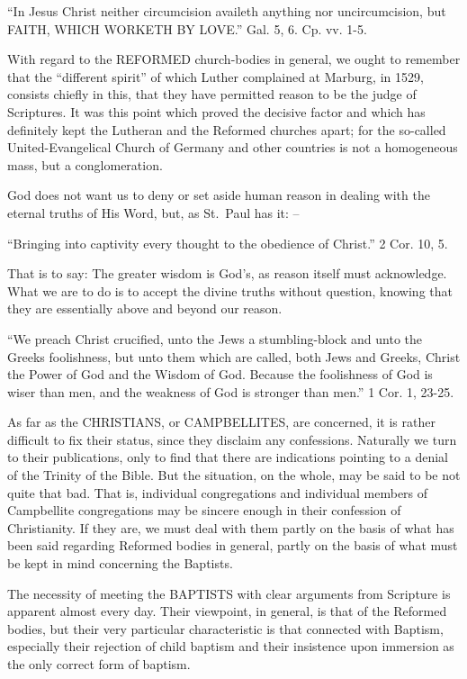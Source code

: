 \documentclass[
]{book}
\begin{document}
``In Jesus Christ neither circumcision availeth anything nor uncircumcision, but FAITH, WHICH WORKETH BY LOVE.'' Gal. 5, 6. Cp. vv. 1-5.

With regard to the REFORMED church-bodies in general, we ought to remember that the ``different spirit'' of which Luther complained at Marburg, in 1529, consists chiefly in this, that they have permitted reason to be the judge of Scriptures. It was this point which proved the decisive factor and which has definitely kept the Lutheran and the Reformed churches apart; for the so-called United-Evangelical Church of Germany and other countries is not a homogeneous mass, but a conglomeration.

God does not want us to deny or set aside human reason in dealing with the eternal truths of His Word, but, as St.~Paul has it: --

``Bringing into captivity every thought to the obedience of Christ.'' 2 Cor. 10, 5.

That is to say: The greater wisdom is God's, as reason itself must acknowledge. What we are to do is to accept the divine truths without question, knowing that they are essentially above and beyond our reason.

``We preach Christ crucified, unto the Jews a stumbling-block and unto the Greeks foolishness, but unto them which are called, both Jews and Greeks, Christ the Power of God and the Wisdom of God. Because the foolishness of God is wiser than men, and the weakness of God is stronger than men.'' 1 Cor. 1, 23-25.

As far as the CHRISTIANS, or CAMPBELLITES, are concerned, it is rather difficult to fix their status, since they disclaim any confessions. Naturally we turn to their publications, only to find that there are indications pointing to a denial of the Trinity of the Bible. But the situation, on the whole, may be said to be not quite that bad. That is, individual congregations and individual members of Campbellite congregations may be sincere enough in their confession of Christianity. If they are, we must deal with them partly on the basis of what has been said regarding Reformed bodies in general, partly on the basis of what must be kept in mind concerning the Baptists.

The necessity of meeting the BAPTISTS with clear arguments from Scripture is apparent almost every day. Their viewpoint, in general, is that of the Reformed bodies, but their very particular characteristic is that connected with Baptism, especially their rejection of child baptism and their insistence upon immersion as the only correct form of baptism.
\end{document}
